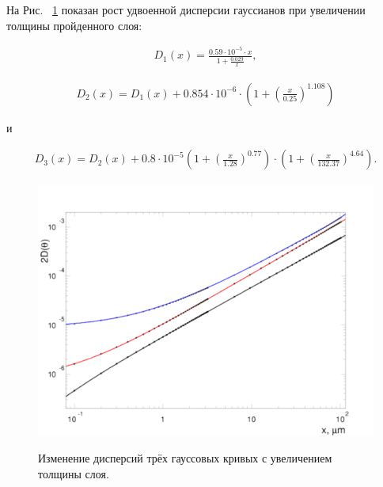 \documentclass[a4paper,12pt]{article}
\begin{document}
\begin{large}
На Рис. ~\ref{fig:DispTheta} показан рост удвоенной дисперсии гауссианов при увеличении толщины пройденного слоя:

\begin{equation}
\label{MSApproximationD1}
\begin{aligned} 
D_1(x)=\frac{0.59\cdot 10^{-5}\cdot x}{1+\frac{0.029}{x}}, 
\end{aligned}
\end{equation}

\begin{equation}
\label{MSApproximationD2}
\begin{aligned} 
D_2(x)=D_1(x)+0.854\cdot 10^{-6}\cdot\left( 1+\left(\frac{x}{0.25} \right)^{1.108}\right)
\end{aligned}
\end{equation}

и

\begin{equation}
\label{MSApproximationD3}
\begin{aligned} 
D_3(x)=D_2(x)+0.8\cdot 10^{-5}\left( 1+\left(\frac{x}{1.28} \right)^{0.77}\right)\cdot\left( 1+\left(\frac{x}{132.37} \right)^{4.64}\right).
\end{aligned}
\end{equation}

\begin{figure}[ht]
  {
     \includegraphics[width=0.99\linewidth]{images/pars246}
  }
  \caption{Изменение дисперсий трёх гауссовых кривых с увеличением толщины слоя.}
  \label{fig:DispTheta}
\end{figure}


\end{large}
\end{document}
